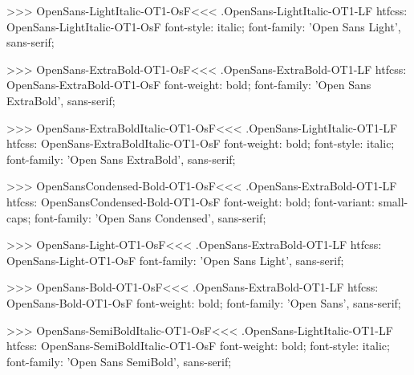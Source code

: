 >>>
\<OpenSans-LightItalic-OT1-OsF\><<<
.OpenSans-LightItalic-OT1-LF
htfcss:  OpenSans-LightItalic-OT1-OsF  font-style: italic; font-family: 'Open Sans Light', sans-serif;

>>>
\<OpenSans-ExtraBold-OT1-OsF\><<<
.OpenSans-ExtraBold-OT1-LF
htfcss:  OpenSans-ExtraBold-OT1-OsF  font-weight: bold; font-family: 'Open Sans ExtraBold', sans-serif;

>>>
\<OpenSans-ExtraBoldItalic-OT1-OsF\><<<
.OpenSans-LightItalic-OT1-LF
htfcss:  OpenSans-ExtraBoldItalic-OT1-OsF  font-weight: bold; font-style: italic; font-family: 'Open Sans ExtraBold', sans-serif;

>>>
\<OpenSansCondensed-Bold-OT1-OsF\><<<
.OpenSans-ExtraBold-OT1-LF
htfcss:  OpenSansCondensed-Bold-OT1-OsF  font-weight: bold; font-variant: small-caps; font-family: 'Open Sans Condensed', sans-serif;

>>>
\<OpenSans-Light-OT1-OsF\><<<
.OpenSans-ExtraBold-OT1-LF
htfcss:  OpenSans-Light-OT1-OsF  font-family: 'Open Sans Light', sans-serif;

>>>
\<OpenSans-Bold-OT1-OsF\><<<
.OpenSans-ExtraBold-OT1-LF
htfcss:  OpenSans-Bold-OT1-OsF  font-weight: bold; font-family: 'Open Sans', sans-serif;

>>>
\<OpenSans-SemiBoldItalic-OT1-OsF\><<<
.OpenSans-LightItalic-OT1-LF
htfcss:  OpenSans-SemiBoldItalic-OT1-OsF  font-weight: bold; font-style: italic; font-family: 'Open Sans SemiBold', sans-serif;

